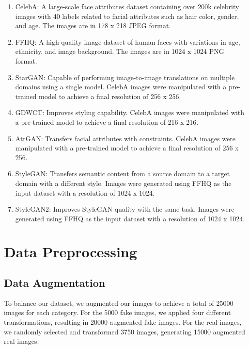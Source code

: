         \begin{enumerate}
            \item CelebA\cite{7410782}: A large-scale face attributes dataset containing over 200k celebrity images with 40 labels related to facial attributes such as hair color, gender, and age. The images are in 178 x 218 JPEG format.
            
            \item FFHQ\cite{NVlabs_ffhq_dataset}: A high-quality image dataset of human faces with variations in age, ethnicity, and image background. The images are in 1024 x 1024 PNG format.
            
            \item StarGAN\cite{choi2018stargan}: Capable of performing image-to-image translations on multiple domains using a single model. CelebA images were manipulated with a pre-trained model to achieve a final resolution of 256 x 256.
            
            \item GDWCT\cite{cho2019imagetoimage}: Improves styling capability. CelebA images were manipulated with a pre-trained model to achieve a final resolution of 216 x 216.
    
            \item AttGAN\cite{8718508}: Transfers facial attributes with constraints. CelebA images were manipulated with a pre-trained model to achieve a final resolution of 256 x 256.
        
            \item StyleGAN\cite{Karras_2020_CVPR}: Transfers semantic content from a source domain to a target domain with a different style. Images were generated using FFHQ as the input dataset with a resolution of 1024 x 1024.
        
            \item StyleGAN2\cite{inproceedings}: Improves StyleGAN quality with the same task. Images were generated using FFHQ as the input dataset with a resolution of 1024 x 1024.
        \end{enumerate}
        
        \section{Data Preprocessing}
        \subsection{Data Augmentation}
            To balance our dataset, we augmented our images to achieve a total of 25000 images for each category. For the 5000 fake images, we applied four different transformations, resulting in 20000 augmented fake images. For the real images, we randomly selected and transformed 3750 images, generating 15000 augmented real images.

